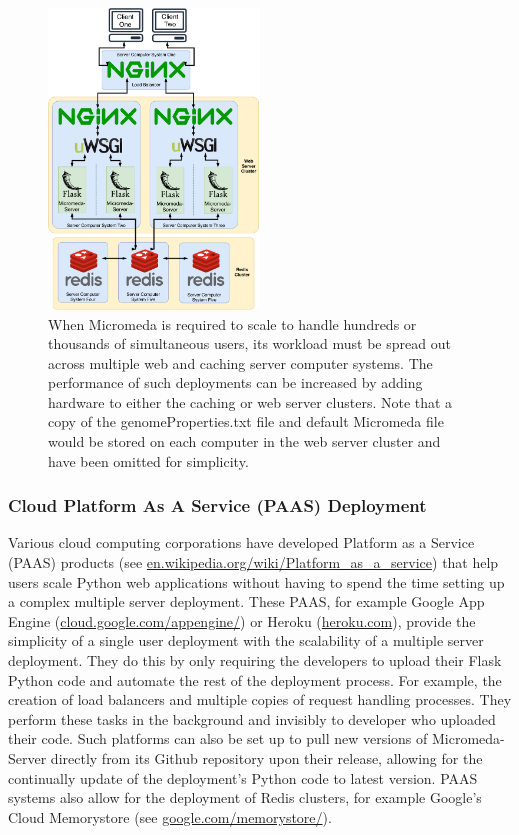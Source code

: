 \begin{figure}[!ht]
  \centering
	\includegraphics[width=0.50\textwidth]{media/micromeda-heavy-deployment.pdf}
	 \caption{When Micromeda is required to scale to handle hundreds or thousands of simultaneous users, its workload must be spread out across multiple web and caching server computer systems. The performance of such deployments can be increased by adding hardware to either the caching or web server clusters. Note that a copy of the genomeProperties.txt file and default Micromeda file would be stored on each computer in the web server cluster and have been omitted for simplicity.}
	 \label{fig:micromeda-large-deploy}
\end{figure}

\subsubsection{Cloud Platform As A Service (PAAS) Deployment}

Various cloud computing corporations have developed Platform as a Service (PAAS) \cite{lawton2008developing} products (see \href{en.wikipedia.org/wiki/Platform\_as\_a\_service}{en.wikipedia.org/wiki/Platform\_as\_a\_service}) that help users scale Python web applications without having to spend the time setting up a complex multiple server deployment. These PAAS, for example Google App Engine (\href{cloud.google.com/appengine/}{cloud.google.com/appengine/}) or Heroku (\href{heroku.com}{heroku.com}), provide the simplicity of a single user deployment with the scalability of a multiple server deployment. They do this by only requiring the developers to upload their Flask Python code and automate the rest of the deployment process. For example, the creation of load balancers and multiple copies of request handling processes. They perform these tasks in the background and invisibly to developer who uploaded their code. Such platforms can also be set up to pull new versions of Micromeda-Server directly from its Github repository upon their release, allowing for the continually update of the deployment's Python code to latest version. PAAS systems also allow for the deployment of Redis clusters, for example Google's Cloud Memorystore (see \href{cloud.google.com/memorystore/}{google.com/memorystore/}).

